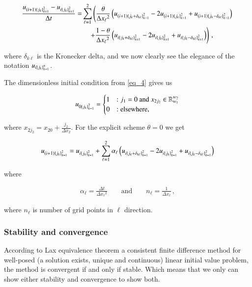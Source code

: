 \documentclass[11pt,english,a4paper]{article}
\begin{document}
\begin{flushleft}
\begin{align}
\frac{u_{(i+1)\left\lbrace{j_k}\right\rbrace_{k=1}^2}-u_{i\left\lbrace{j_k}\right\rbrace_{k=1}^2}}{\Delta t} =& \sum_{\ell=1}^2 \left(\frac{\theta}{\Delta {x_\ell}^2}\left({u_{(i+1)\left\lbrace{j_k+\delta_{k\ell}}\right\rbrace_{k=1}^2} - 2 u_{(i+1)\left\lbrace{j_k}\right\rbrace_{k=1}^2} + u_{(i+1)\left\lbrace{j_k-\delta_{k\ell}}\right\rbrace_{k=1}^2}}\right) \right.
\nonumber\\
&\quad \left. + \frac{1-\theta}{\Delta {x_\ell}^2}\left({u_{i\left\lbrace{j_k+\delta_{k\ell}}\right\rbrace_{k=1}^2} - 2u_{i\left\lbrace{j_k}\right\rbrace_{k=1}^2} +u_{i\left\lbrace{j_k-\delta_{k\ell}}\right\rbrace_{k=1}^2}}\right)\right) \,,
\label{eq_16}
\end{align}

where $\delta_{k\ell}$ is the Kronecker delta, and we now clearly see the elegance of the notation $u_{i\left\lbrace{j_k}\right\rbrace_{k=1}^n}$. \linebreak

The dimensionless initial condition from \eqref{eq_4} gives us

\begin{align*}
u_{0\left\lbrace{j_k}\right\rbrace_{k=1}^2} = \begin{cases} 1 & : j_1 = 0 \text{ and } x_{2 j_2} \in \mathbb{R}_{w_1}^{w_2} \\ 0 & :\text{elsewhere,} \end{cases} 
\end{align*}

where $x_{2 j_2} = x_{2 0}  + \frac{j_2}{\Delta x_2}$. For the explicit scheme $\theta = 0$ we get

\begin{align}
u_{(i+1)\left\lbrace{j_k}\right\rbrace_{k=1}^2} = u_{i\left\lbrace{j_k}\right\rbrace_{k=1}^2} + \sum_{\ell=1}^2 \alpha_\ell\left({u_{i\left\lbrace{j_k+\delta_{k\ell}}\right\rbrace_{k=1}^2} - 2u_{i\left\lbrace{j_k}\right\rbrace_{k=1}^2} +u_{i\left\lbrace{j_k-\delta_{k\ell}}\right\rbrace_{k=1}^2}}\right)
\label{eq_17}
\end{align}

where

\begin{align*}
\alpha_\ell = \frac{\Delta t}{\Delta {x_\ell}^2} \qquad \text{and} \qquad n_\ell = \frac{1}{\Delta x_\ell} \,,
\end{align*}

where $n_\ell$ is number of grid points in $\ell$ direction. 

\subsubsection{Stability and convergence} \label{sec_explicit_stab_conv}

According to Lax equivalence theorem a consistent finite difference method for well-posed  (a solution exists, unique and continuous) linear initial value problem, the method is convergent if and only if stable. Which means that we only can show either stability and convergence to show both. \linebreak


\end{flushleft}
\end{document}
